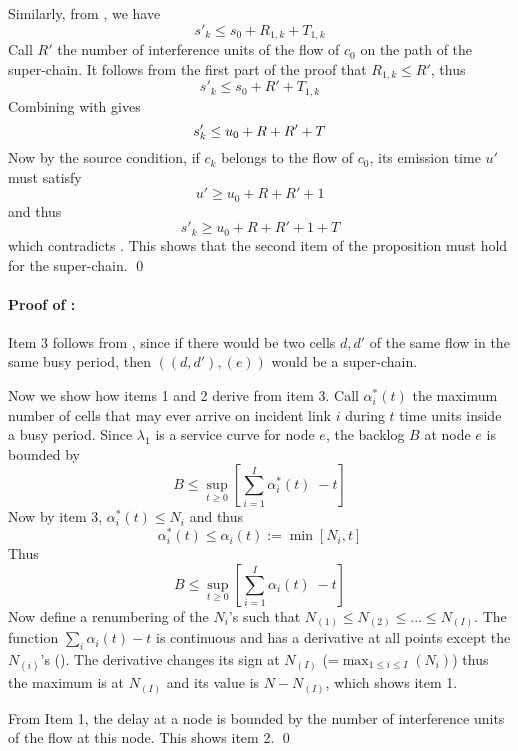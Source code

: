 Similarly, from , we have
$$s'_k \leq s_0 + R_{1,k}+T_{1,k}$$
Call $R'$ the number of interference units of the flow of $c_0$ on
the path of the super-chain. It follows from the first part of the
proof that $R_{1,k} \leq R'$, thus
$$
s'_k \leq s_0 + R'+T_{1,k}
$$
Combining with  gives
\begin{equation}\mylabel{eq-tonfifo238197}
 s'_k \leq u_0 + R + R' +T
\end{equation}
Now by the source condition, if $c_k$  belongs to the flow of
$c_0$, its emission time $u'$ must satisfy
$$
u' \geq u_0 + R + R' + 1
$$
and thus
$$
s'_k \geq u_0 + R + R' + 1 + T
$$
which contradicts . This shows that the
second item of the proposition must hold for the super-chain.
 \qed

\paragraph{Proof of : }
Item 3 follows from , since if there would
be two cells $d, d'$ of the same flow in the same busy period,
then $((d, d'),(e))$ would be a super-chain.

Now we show how items 1 and 2 derive from item 3. Call
$\alpha^*_i(t)$ the maximum number of cells that may ever arrive
on incident link $i$ during $t$ time units inside a busy period.
Since $\lambda_1$ is a service curve for node $e$, the backlog $B$
at node $e$ is bounded by
$$
B \leq \sup_{t \geq 0} \left[\sum_{i=1}^{I} \alpha^*_i(t) \;  - t
\right]
$$
Now by item 3, $\alpha^*_i(t) \leq N_i$ and thus
$$\alpha^*_i (t) \leq \alpha_i(t):= \min [N_i, t ]
$$
Thus
$$
B \leq \sup_{t \geq 0} \left[\sum_{i=1}^{I} \alpha_i(t) \;  - t
\right]
$$
Now define a renumbering of the $N_i$'s such that $N_{(1)} \leq
N_{(2)} \leq ...\leq N_{(I)}$. The function $\sum_i \alpha_i(t)
-t$ is continuous and has a derivative at all points except the
$N_{(i)}$'s (). The derivative changes its
sign at $N_{(I)}$ (=$\max_{1\leq i\leq I}(N_i)$) thus the maximum
is at $N_{(I)}$ and its value is $N-N_{(I)}$, which shows item 1.
\begin{figure}[!htbp]
\end{figure}

From Item 1, the delay at a node is bounded by the number of
interference units of the flow at this node. This shows item 2.
 \qed

